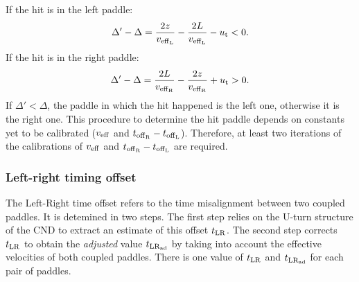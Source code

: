 If the hit is in the left paddle:
\begin{equation}
\Delta'-\Delta= \frac{2z}{v_{\rm{eff}_L}} - \frac{2L}{v_{\rm{eff}_L}} -u_{\rm{t}} <0.
\end{equation}
If the hit is in the right paddle:
\begin{equation}
\Delta'-\Delta= \frac{2L}{v_{\rm{eff}_{\rm{R}}}}-\frac{2z}{v_{\rm{eff}_{\rm{R}}}} +u_{\rm{t}} >0.
\end{equation}
If $\Delta'<\Delta$, the paddle in which the hit happened is the left one, otherwise it is the right one. This procedure to determine the hit paddle depends on constants yet to be calibrated ($v_{\rm{eff}}$ and $t_{\rm{off}_{\rm{R}}}-t_{\rm{off}_{\rm{L}}}$). Therefore, at least two iterations of the calibrations of $v_{\rm{eff}}$ and $t_{\rm{off}_{\rm{R}}}-t_{\rm{off}_{\rm{L}}}$ are required.

\subsubsection{Left-right timing offset}

The Left-Right time offset refers to the time misalignment between two coupled paddles. It is detemined in two steps. The first step relies on the U-turn structure of the CND to extract an estimate of this offset $t_{\rm{LR}}$. The second step corrects $t_{\rm{LR}}$ to obtain the {\it adjusted} value $t_{\rm{LR}_{\rm{ad}}}$ by taking into account the effective velocities of both coupled paddles. There is one value of $t_{\rm{LR}}$ and $t_{\rm{LR}_{\rm{ad}}}$ for each pair of paddles. 

